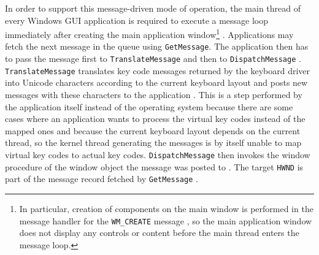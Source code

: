 			In order to support this message-driven mode of operation, the main
			thread of every Windows GUI application is required to execute a
			message loop immediately after creating the main application
			window\footnote{In particular, creation of components on the main
			window is performed in the message handler for the
			\texttt{WM\_CREATE} message \cite{usingwindows}, so the main application window does
			not display any controls or content before the main thread enters
			the message loop.} \cite{messages}. Applications may fetch the next message in the
			queue using \texttt{GetMessage}. The application then has to pass
			the message first to \texttt{TranslateMessage} and then to
			\texttt{DispatchMessage} \cite{usingwindows}. \texttt{TranslateMessage} translates key
			code messages returned by the keyboard driver into Unicode
			characters according to the current keyboard layout and posts new
			messages with these characters to the application \cite{translatemessage}. This is a step performed
			by the application itself instead of the operating system because
			there are some cases where an application wants to process the virtual
			key codes instead of the mapped ones \cite{translatemessage} and because the current keyboard
			layout depends on the current thread, so the kernel thread generating
			the messages is by itself unable to map virtual key codes to actual
			key codes. \texttt{DispatchMessage} then invokes the window procedure
			of the window object the message was posted to \cite{dispatchmessage}. The target \texttt{HWND}
			is part of the message record fetched by \texttt{GetMessage} \cite{msgstruct}.


